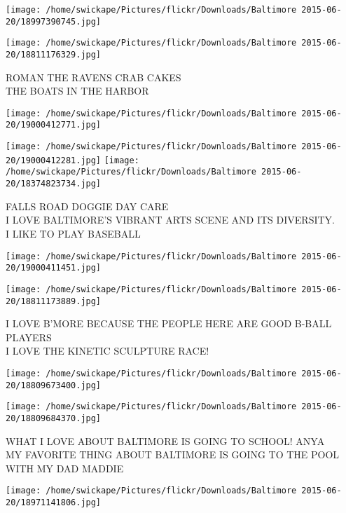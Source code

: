 \documentclass[10pt,letterpaper]{article}
\begin{document}
\texttt{[image: /home/swickape/Pictures/flickr/Downloads/Baltimore 2015-06-20/18997390745.jpg]}

\vspace{0.25in}
\texttt{[image: /home/swickape/Pictures/flickr/Downloads/Baltimore 2015-06-20/18811176329.jpg]}

ROMAN THE RAVENS CRAB CAKES\\
THE BOATS IN THE HARBOR\\
\pagebreak

\texttt{[image: /home/swickape/Pictures/flickr/Downloads/Baltimore 2015-06-20/19000412771.jpg]}

\vspace{0.25in}
\texttt{[image: /home/swickape/Pictures/flickr/Downloads/Baltimore 2015-06-20/19000412281.jpg]}
\texttt{[image: /home/swickape/Pictures/flickr/Downloads/Baltimore 2015-06-20/18374823734.jpg]}

FALLS ROAD DOGGIE DAY CARE\\
I LOVE BALTIMORE'S VIBRANT ARTS SCENE AND ITS DIVERSITY.\\
I LIKE TO PLAY BASEBALL\\
\pagebreak

\texttt{[image: /home/swickape/Pictures/flickr/Downloads/Baltimore 2015-06-20/19000411451.jpg]}

\vspace{0.25in}
\texttt{[image: /home/swickape/Pictures/flickr/Downloads/Baltimore 2015-06-20/18811173889.jpg]}

I LOVE B'MORE BECAUSE THE PEOPLE HERE ARE GOOD B{-}BALL PLAYERS\\
I LOVE THE KINETIC SCULPTURE RACE!\\
\pagebreak

\texttt{[image: /home/swickape/Pictures/flickr/Downloads/Baltimore 2015-06-20/18809673400.jpg]}

\vspace{0.25in}
\texttt{[image: /home/swickape/Pictures/flickr/Downloads/Baltimore 2015-06-20/18809684370.jpg]}

WHAT I LOVE ABOUT BALTIMORE IS GOING TO SCHOOL!  ANYA\\
MY FAVORITE THING ABOUT BALTIMORE IS GOING TO THE POOL WITH MY DAD MADDIE\\
\pagebreak

\texttt{[image: /home/swickape/Pictures/flickr/Downloads/Baltimore 2015-06-20/18971141806.jpg]}
\end{document}
